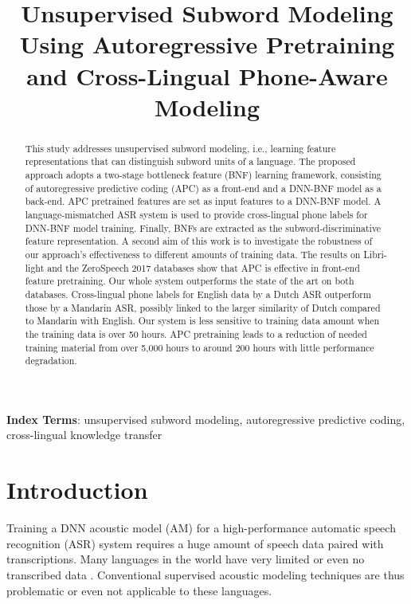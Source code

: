 \documentclass[a4paper]{article}
\title{Unsupervised Subword Modeling Using Autoregressive Pretraining and Cross-Lingual Phone-Aware Modeling}
\begin{document}
\maketitle
% 
\begin{abstract}
This study addresses unsupervised subword modeling, i.e., learning feature representations that can distinguish subword units of a language. 
The proposed approach adopts a two-stage bottleneck feature (BNF) learning framework, consisting of 
autoregressive predictive coding (APC) as a front-end  and a DNN-BNF model as a back-end. 
APC pretrained features are set as input features to a DNN-BNF model. A  language-mismatched ASR system is used to provide cross-lingual phone labels for DNN-BNF model training. Finally, BNFs are extracted as the subword-discriminative feature representation. A second aim of this work is to investigate the robustness of our approach's effectiveness to different amounts of training data. The results on Libri-light and the ZeroSpeech 2017 databases show that APC is effective in front-end feature pretraining.
Our whole system outperforms the state of the art on both databases.
Cross-lingual phone labels for  English data by a Dutch ASR outperform those by a Mandarin ASR, possibly linked to the larger similarity of Dutch compared to Mandarin with English.
Our system is less sensitive to training data amount  when the training data is over 50 hours.  
APC pretraining leads to a reduction of needed training material from over 5,000 hours to around 200 hours with little performance degradation.


\end{abstract}
\noindent\textbf{Index Terms}: unsupervised subword modeling, autoregressive predictive coding, cross-lingual knowledge transfer

\section{Introduction}

Training a DNN acoustic model (AM) for a high-performance automatic speech recognition (ASR) system requires a huge amount of speech data paired with  transcriptions. 
Many languages in the world have very limited or even no transcribed data \cite{dunbar2017zero}. 
Conventional supervised acoustic modeling techniques are thus problematic or even not applicable to these languages.
\end{document}
